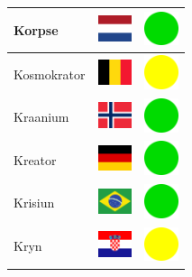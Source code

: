 \documentclass[12pt, a4paper, twoside]{report}
\begin{document}
\begin{center}
\begin{longtable}{|p{5cm}|p{2cm}|p{2cm}|}
Korpse & \includegraphics[width=1cm]{4x3/nl} & \includegraphics[width=1cm]{likes/y} \\ \hline
Kosmokrator & \includegraphics[width=1cm]{4x3/be} & \includegraphics[width=1cm]{likes/m} \\ \hline
Kraanium & \includegraphics[width=1cm]{4x3/no} & \includegraphics[width=1cm]{likes/y} \\ \hline
Kreator & \includegraphics[width=1cm]{4x3/de} & \includegraphics[width=1cm]{likes/y} \\ \hline
Krisiun & \includegraphics[width=1cm]{4x3/br} & \includegraphics[width=1cm]{likes/y} \\ \hline
Kryn & \includegraphics[width=1cm]{4x3/hr} & \includegraphics[width=1cm]{likes/m} \\ \hline

\end{longtable}
\end{center}
\end{document}
